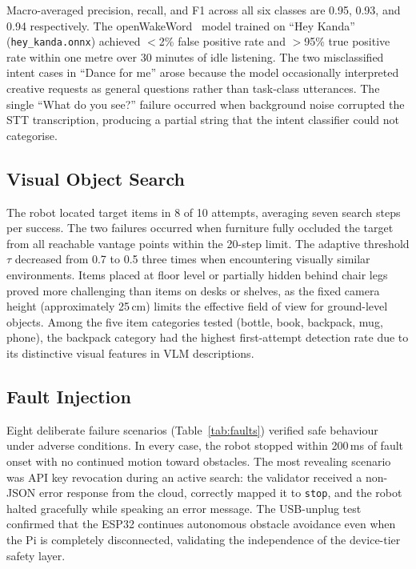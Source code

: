 \documentclass[conference]{IEEEtran}
\newcommand{\safe}{\texttt{stop}}
\begin{document}
Macro-averaged precision, recall, and F1 across all six classes are 0.95, 0.93, and 0.94 respectively. The openWakeWord~\cite{openwakeword2024} model trained on ``Hey Kanda'' (\texttt{hey\_kanda.onnx}) achieved $<$2\% false positive rate and $>$95\% true positive rate within one metre over 30 minutes of idle listening. The two misclassified intent cases in ``Dance for me'' arose because the model occasionally interpreted creative requests as general questions rather than task-class utterances. The single ``What do you see?'' failure occurred when background noise corrupted the STT transcription, producing a partial string that the intent classifier could not categorise.

\subsection{Visual Object Search}

The robot located target items in 8 of 10 attempts, averaging seven search steps per success. The two failures occurred when furniture fully occluded the target from all reachable vantage points within the 20-step limit. The adaptive threshold $\tau$ decreased from 0.7 to 0.5 three times when encountering visually similar environments. Items placed at floor level or partially hidden behind chair legs proved more challenging than items on desks or shelves, as the fixed camera height (approximately 25\,cm) limits the effective field of view for ground-level objects. Among the five item categories tested (bottle, book, backpack, mug, phone), the backpack category had the highest first-attempt detection rate due to its distinctive visual features in VLM descriptions.

\subsection{Fault Injection}

Eight deliberate failure scenarios (Table~\ref{tab:faults}) verified safe behaviour under adverse conditions. In every case, the robot stopped within 200\,ms of fault onset with no continued motion toward obstacles. The most revealing scenario was API key revocation during an active search: the validator received a non-JSON error response from the cloud, correctly mapped it to \safe{}, and the robot halted gracefully while speaking an error message. The USB-unplug test confirmed that the ESP32 continues autonomous obstacle avoidance even when the Pi is completely disconnected, validating the independence of the device-tier safety layer.
\end{document}
